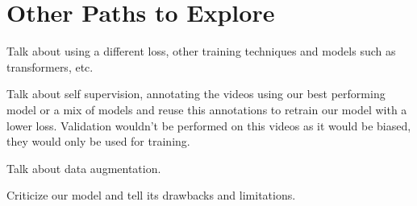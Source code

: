 \section{Other Paths to Explore}
Talk about using a different loss, other training techniques and models such as transformers, etc.

Talk about self supervision, annotating the videos using our best performing model or a mix of models and reuse this annotations to retrain our model with a lower loss. Validation wouldn't be performed on this videos as it would be biased, they would only be used for training.

Talk about data augmentation.

Criticize our model and tell its drawbacks and limitations.